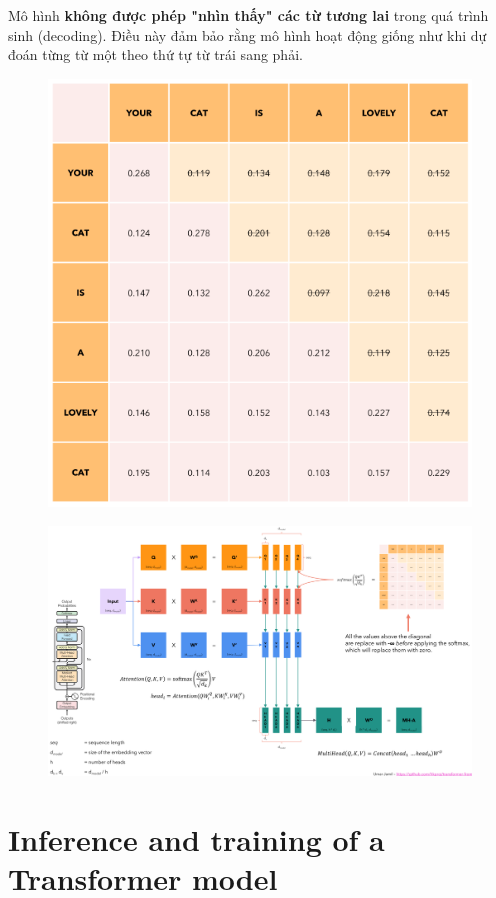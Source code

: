 \documentclass{book}
\begin{document}
        Mô hình \textbf{không được phép "nhìn thấy" các từ tương lai} trong quá trình sinh (decoding).  
        Điều này đảm bảo rằng mô hình hoạt động giống như khi dự đoán từng từ một theo thứ tự từ trái sang phải.
        \begin{figure}[H]
            \centering
            \includegraphics[width=0.5  \linewidth]{images/12d_16.png}
    
        \end{figure}
        \begin{figure}[H]
            \centering
            \includegraphics[width=1.0  \linewidth]{images/12d_17.png}
    
        \end{figure}
    \section{Inference and training of a Transformer model}
\end{document}
